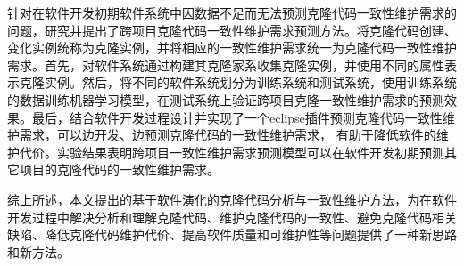 {针对在软件开发初期软件系统中因数据不足而无法预测克隆代码一致性维护需求的问题，研究并提出了跨项目克隆代码一致性维护需求预测方法。将克隆代码创建、变化实例统称为克隆实例，并将相应的一致性维护需求统一为克隆代码一致性维护需求。首先，对软件系统通过构建其克隆家系收集克隆实例，并使用不同的属性表示克隆实例。然后，将不同的软件系统划分为训练系统和测试系统，使用训练系统的数据训练机器学习模型，在测试系统上验证跨项目克隆一致性维护需求的预测效果。最后，结合软件开发过程设计并实现了一个eclipse插件预测克隆代码一致性维护需求，可以边开发、边预测克隆代码的一致性维护需求， 有助于降低软件的维护代价。实验结果表明跨项目一致性维护需求预测模型可以在软件开发初期预测其它项目的克隆代码的一致性维护需求。

综上所述，本文提出的基于软件演化的克隆代码分析与一致性维护方法，为在软件开发过程中解决分析和理解克隆代码、维护克隆代码的一致性、避免克隆代码相关缺陷、降低克隆代码维护代价、提高软件质量和可维护性等问题提供了一种新思路和新方法。
}


